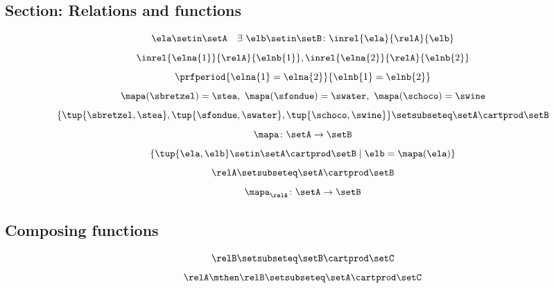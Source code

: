 \begin{forslides}
    \subsection{Section: Relations and functions}

    \begin{equation}\label{eq:slides_session2_rel_99}
        \ela \setin \setA \quad \exists \ \elb \setin \setB\colon  \inrel{\ela}{\relA}{\elb}
    \end{equation}
    \begin{equation}\label{eq:slides_session2_rel_100}
        \inrel{\elna{1}}{\relA}{\elnb{1}}, \inrel{\elna{2}}{\relA}{\elnb{2}}
    \end{equation}
    \begin{equation}\label{eq:slides_session2_rel_101}
        \prfperiod{\elna{1} = \elna{2}}{\elnb{1} = \elnb{2}}
    \end{equation}
    \begin{equation}\label{eq:slides_session2_rel_102}
        \mapa (\sbretzel) = \stea, \ \mapa (\sfondue) = \swater, \ \mapa(\schoco) = \swine
    \end{equation}
    \begin{equation}\label{eq:slides_session2_rel_103}
        \{ \tup{\sbretzel, \stea}, \tup{\sfondue, \swater}, \tup{\schoco, \swine} \} \setsubseteq \setA \cartprod \setB
    \end{equation}
    \begin{equation}\label{eq:slides_session2_rel_104}
        \mapa \colon \setA \to \setB
    \end{equation}
    \begin{equation}\label{eq:slides_session2_rel_105}
        \{ \tup{\ela,\elb} \setin \setA \cartprod \setB \mid \elb= \mapa(\ela) \}
    \end{equation}
    \begin{equation}\label{eq:slides_session2_rel_106}
        \relA \setsubseteq \setA \cartprod \setB
    \end{equation}
    \begin{equation}\label{eq:slides_session2_rel_107}
        \mapa_\relA \colon \setA \to \setB
    \end{equation}

    \subsection{Composing functions}

    \begin{equation}\label{eq:slides_session2_rel_108}
        \relB \setsubseteq \setB \cartprod \setC
    \end{equation}
    \begin{equation}\label{eq:slides_session2_rel_109}
        \relA \mthen \relB \setsubseteq \setA \cartprod \setC
    \end{equation}


\end{forslides}
